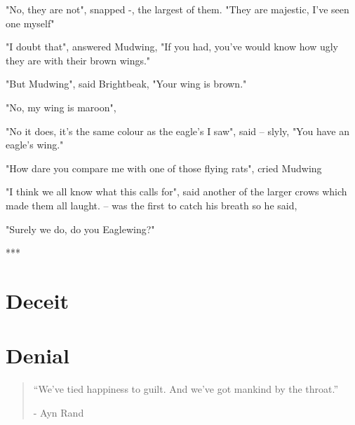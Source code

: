 \documentclass[smalldemyvopaper,11pt,twoside,onecolumn,openright,extrafontsizes]{memoir}
\begin{document}
"No, they are not", snapped -, the largest of them. "They are majestic, I've seen one myself"

"I doubt that", answered Mudwing, "If you had, you've would know how ugly they are with their brown wings."

"But Mudwing", said Brightbeak, "Your wing is brown."

"No, my wing is maroon", 

"No it does, it's the same colour as the eagle's I saw", said -- slyly, "You have an eagle's wing."

"How dare you compare me with one of those flying rats", cried Mudwing

"I think we all know what this calls for", said another of the larger crows which made them all laught. -- was the first to catch his breath so he said,  

"Surely we do, do you Eaglewing?"

***



\chapter{Deceit}




\chapter{Denial}

\vspace{-1.3cm}
\begin{localsize}{10}
  \begin{quote}
    “We've tied happiness to guilt. And we've got mankind by the throat.”
    \begin{flushright}- Ayn Rand \end{flushright}
  \end{quote} 
\end{localsize}
\vspace{1cm}
\end{document}
